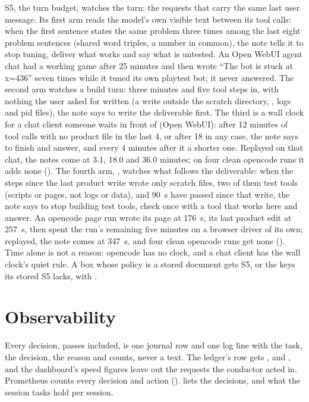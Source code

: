 S5, the turn budget, watches the turn: the requests that carry the same last user message. Its first arm reads the model's own visible text between its tool calls: when the first sentence states the same problem three times among the last eight problem sentences (shared word triples, a number in common), the note tells it to stop tuning, deliver what works and say what is untested. An Open WebUI agent chat had a working game after 25 minutes and then wrote ``The bot is stuck at x=436'' seven times while it tuned its own playtest bot; it never answered. The second arm watches a build turn: three minutes and five tool steps in, with nothing the user asked for written (a write outside the scratch directory, , logs and pid files), the note says to write the deliverable first. The third is a wall clock for a chat client someone waits in front of (Open WebUI): after 12 minutes of tool calls with no product file in the last 4, or after 18 in any case, the note says to finish and answer, and every 4 minutes after it a shorter one. Replayed on that chat, the notes come at 3.1, 18.0 and 36.0 minutes; on four clean opencode runs it adds none (\measured). The fourth arm, , watches what follows the deliverable: when the steps since the last product write wrote only scratch files, two of them test tools (scripts or pages, not logs or data), and 90~s have passed since that write, the note says to stop building test tools, check once with a tool that works here and answer. An opencode page run wrote its page at 176~s, its last product edit at 257~s, then spent the run's remaining five minutes on a browser driver of its own; replayed, the note comes at 347~s, and four clean opencode runs get none (\measured). Time alone is not a reason: opencode has no clock, and a chat client has the wall clock's quiet rule. A box whose policy is a stored document gets S5, or the keys its stored S5 lacks, with .

\section{Observability}

Every decision, passes included, is one journal row and one \code{[conductor]} log line with the task, the decision, the reason and counts, never a text. The ledger's  row gets ,  and , and the dashboard's speed figures leave out the requests the conductor acted in. Prometheus counts every decision and action ().  lists the decisions, and  what the session tasks hold per session.

